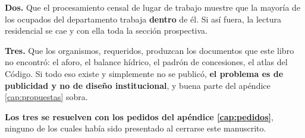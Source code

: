 \textbf{Dos.} Que el procesamiento censal de lugar de trabajo muestre que la mayoría de los
ocupados del departamento trabaja \textbf{dentro} de él. Si así fuera, la lectura residencial se
cae y con ella toda la sección prospectiva.

\textbf{Tres.} Que los organismos, requeridos, produzcan los documentos que este libro no
encontró: el aforo, el balance hídrico, el padrón de concesiones, el atlas del Código. Si todo
eso existe y simplemente no se publicó, \textbf{el problema es de publicidad y no de diseño
institucional}, y buena parte del apéndice \ref{cap:propuestas} sobra.

\textbf{Los tres se resuelven con los pedidos del apéndice \ref{cap:pedidos}}, ninguno de los
cuales había sido presentado al cerrarse este manuscrito.

